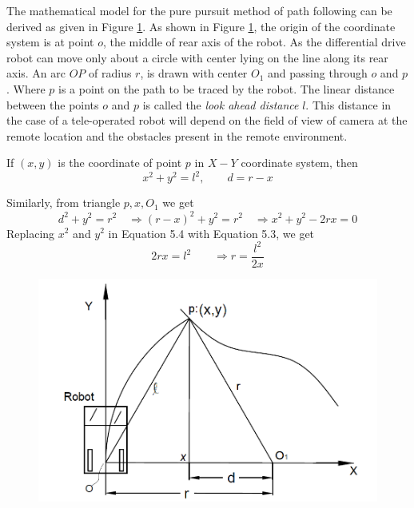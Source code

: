 The mathematical model for the pure pursuit method of path following can be derived as given in Figure \ref{fig:purePGeo}.
As shown in Figure \ref{fig:purePGeo}, the origin of the coordinate system is at point $o$, the middle of rear axis of the robot. As the differential drive robot  can move only about a circle with center  lying on the line along its rear axis. An arc $OP$ of radius $r$, is drawn with center $O_1$ and passing through $o$ and $p$. Where $p$ is a point on the path to be traced by the robot. The linear distance  between the points $o$ and  $p$ is called the\textit{ look ahead distance} $l$. This distance in the case of a tele-operated robot will depend on the field of view of camera at the remote location and the obstacles present in the remote environment.

If $(x,y)$ is the coordinate of point $p$ in $X-Y$ coordinate system, then 
\begin{equation}
x^2+y^2=l^2, \quad \quad d=r-x
\end{equation}

Similarly, from triangle $p, x, O_1$ we get
\begin{equation}
d^2+y^2=r^2\quad \Rightarrow (r-x)^2+y^2=r^2 \quad \Rightarrow x^2+y^2-2rx=0
\end{equation}
Replacing $x^2$ and $y^2$ in Equation 5.4 with Equation 5.3, we get
\begin{equation}
\label{ppControl}
2rx=l^2\quad \quad \Rightarrow r=\frac{l^2}{2x}
\end{equation}
\begin{figure}
	\includegraphics[width=\linewidth,keepaspectratio]{Chapter6/fig/purepesuitgeometry2}
	\label{fig:purePGeo} 
\end{figure}


